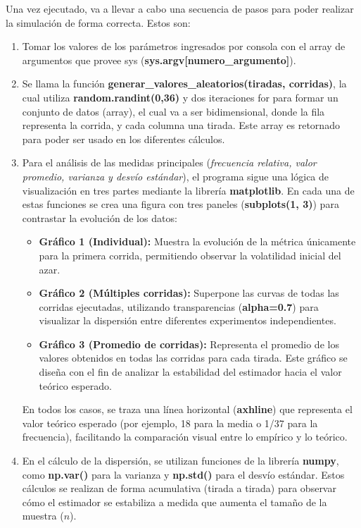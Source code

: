 \documentclass{article}
\begin{document}
Una vez ejecutado, va a llevar a cabo una secuencia de pasos para poder realizar la simulación de forma correcta. Estos son: 
\begin{enumerate}
    \item Tomar los valores de los parámetros ingresados por consola con el array de argumentos que provee sys (\textbf{sys.argv[numero\_argumento]}).
    \item Se llama la función \textbf{generar\_valores\_aleatorios(tiradas, corridas)}, la cual utiliza \textbf{random.randint(0,36)} y dos iteraciones for para formar un conjunto de datos (array), el cual va a ser bidimensional, donde la fila representa la corrida, y cada columna una tirada. Este array es retornado para poder ser usado en los diferentes cálculos.
    \item Para el análisis de las medidas principales (\textit{frecuencia relativa, valor promedio, varianza y desvío estándar}), el programa sigue una lógica de visualización en tres partes mediante la librería \textbf{matplotlib}. En cada una de estas funciones se crea una figura con tres paneles (\textbf{subplots(1, 3)}) para contrastar la evolución de los datos:\begin{itemize}
    \item \textbf{Gráfico 1 (Individual):} Muestra la evolución de la métrica únicamente para la primera corrida, permitiendo observar la volatilidad inicial del azar.
    \item \textbf{Gráfico 2 (Múltiples corridas):} Superpone las curvas de todas las corridas ejecutadas, utilizando transparencias (\textbf{alpha=0.7}) para visualizar la dispersión entre diferentes experimentos independientes.
    \item \textbf{Gráfico 3 (Promedio de corridas):} Representa el promedio de los valores obtenidos en todas las corridas para cada tirada. Este gráfico se diseña con el fin de analizar la estabilidad del estimador hacia el valor teórico esperado.\end{itemize}En todos los casos, se traza una línea horizontal (\textbf{axhline}) que representa el valor teórico esperado (por ejemplo, 18 para la media o 1/37 para la frecuencia), facilitando la comparación visual entre lo empírico y lo teórico.
    \item En el cálculo de la dispersión, se utilizan funciones de la librería \textbf{numpy}, como \textbf{np.var()} para la varianza y \textbf{np.std()} para el desvío estándar. Estos cálculos se realizan de forma acumulativa (tirada a tirada) para observar cómo el estimador se estabiliza a medida que aumenta el tamaño de la muestra ($n$).

\end{enumerate}
\end{document}
